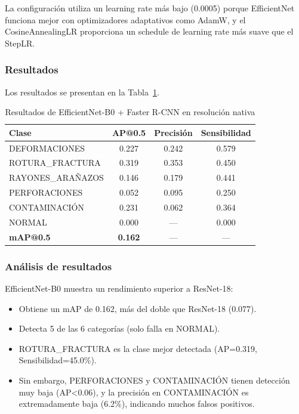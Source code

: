 La configuración utiliza un learning rate más bajo (0.0005) porque EfficientNet funciona mejor con optimizadores adaptativos como AdamW, y el CosineAnnealingLR proporciona un schedule de learning rate más suave que el StepLR.

\subsubsection{Resultados}

Los resultados se presentan en la Tabla~\ref{tab:efficientnet_nativa}.

\begin{table}[htbp]
\centering
\begin{tabular}{lccc}
\toprule
\textbf{Clase} & \textbf{AP@0.5} & \textbf{Precisión} & \textbf{Sensibilidad} \\
\midrule
DEFORMACIONES & 0.227 & 0.242 & 0.579 \\
\mbox{ROTURA\_FRACTURA} & 0.319 & 0.353 & 0.450 \\
\mbox{RAYONES\_ARAÑAZOS} & 0.146 & 0.179 & 0.441 \\
PERFORACIONES & 0.052 & 0.095 & 0.250 \\
CONTAMINACIÓN & 0.231 & 0.062 & 0.364 \\
NORMAL & 0.000 & --- & 0.000 \\
\midrule
\textbf{mAP@0.5} & \textbf{0.162} & --- & --- \\
\bottomrule
\end{tabular}
\caption{Resultados de EfficientNet-B0 + Faster R-CNN en resolución nativa}
\label{tab:efficientnet_nativa}
\end{table}

\FloatBarrier
\subsubsection{Análisis de resultados}

EfficientNet-B0 muestra un rendimiento superior a ResNet-18:

\begin{itemize}
    \item Obtiene un mAP de 0.162, más del doble que ResNet-18 (0.077).
    \item Detecta 5 de las 6 categorías (solo falla en NORMAL).
    \item \mbox{ROTURA\_FRACTURA} es la clase mejor detectada (AP=0.319, Sensibilidad=45.0\%).
    \item Sin embargo, PERFORACIONES y CONTAMINACIÓN tienen detección muy baja (AP<0.06), y la precisión en CONTAMINACIÓN es extremadamente baja (6.2\%), indicando muchos falsos positivos.
\end{itemize}

